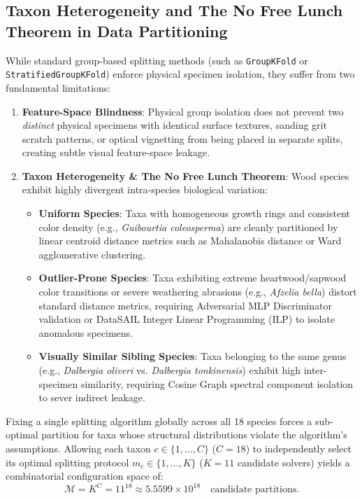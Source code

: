 \subsection{Taxon Heterogeneity and The No Free Lunch Theorem in Data Partitioning}
While standard group-based splitting methods (such as \texttt{GroupKFold} or \texttt{StratifiedGroupKFold}) enforce physical specimen isolation, they suffer from two fundamental limitations:
\begin{enumerate}[label=\textbf{\arabic*:}, leftmargin=*]
\item \textbf{Feature-Space Blindness}: Physical group isolation does not prevent two \emph{distinct} physical specimens with identical surface textures, sanding grit scratch patterns, or optical vignetting from being placed in separate splits, creating subtle visual feature-space leakage.
\item \textbf{Taxon Heterogeneity \& The No Free Lunch Theorem}: Wood species exhibit highly divergent intra-species biological variation:
\begin{itemize}
\item \textbf{Uniform Species}: Taxa with homogeneous growth rings and consistent color density (e.g., \textit{Guibourtia coleosperma}) are cleanly partitioned by linear centroid distance metrics such as Mahalanobis distance or Ward agglomerative clustering.
\item \textbf{Outlier-Prone Species}: Taxa exhibiting extreme heartwood/sapwood color transitions or severe weathering abrasions (e.g., \textit{Afzelia bella}) distort standard distance metrics, requiring Adversarial MLP Discriminator validation or DataSAIL Integer Linear Programming (ILP) to isolate anomalous specimens.
\item \textbf{Visually Similar Sibling Species}: Taxa belonging to the same genus (e.g., \textit{Dalbergia oliveri} vs. \textit{Dalbergia tonkinensis}) exhibit high inter-specimen similarity, requiring Cosine Graph spectral component isolation to sever indirect leakage.
\end{itemize}
\end{enumerate}

Fixing a single splitting algorithm globally across all 18 species forces a sub-optimal partition for taxa whose structural distributions violate the algorithm's assumptions. Allowing each taxon $c \in \{1, \dots, C\}$ ($C=18$) to independently select its optimal splitting protocol $m_c \in \{1, \dots, K\}$ ($K=11$ candidate solvers) yields a combinatorial configuration space of:
\begin{equation}
\mathcal{M} = K^C = 11^{18} \approx 5.5599 \times 10^{18} \quad \text{candidate partitions.}
\end{equation}

